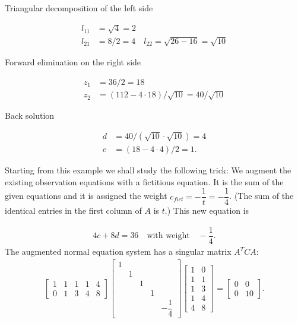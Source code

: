 \begin{adjustwidth}{2em}{2em}
	Triangular decomposition of the left side
\end{adjustwidth}
\begin{align*}
l_{11} &= \sqrt{4} = 2 \\
l_{21} &=  8/2     = 4   \quad    l_{22} = \sqrt{26 - 16}  = \sqrt{10}
\end{align*}
\begin{adjustwidth}{2em}{2em}
	Forward elimination on the right side
\end{adjustwidth}
\begin{align*}
z_{1} &= 36/2 = 18 \\
z_{2} &=  (112 - 4\cdot18) /\sqrt{10}  = 40 /\sqrt{10}
\end{align*}
\begin{adjustwidth}{2em}{2em}
	Back solution 
\end{adjustwidth}
\begin{align*}
d &= 40/(\sqrt{10}\cdot\sqrt{10}) = 4 \\
c &=  (18 - 4\cdot 4) / 2  = 1.
\end{align*}
\begin{flushleft}
	Starting from this example we shall study the following trick: We augment the existing observation equations with a fictitious equation. It is the sum of the given equations and
	it is assigned the weight $ c_{fict} = -\dfrac{1}{t} = - \dfrac{1}{4}$. (The sum of the identical entries in the first 
	column of $A$ is $t$.) This new equation is
\end{flushleft}
\begin{align}
4c+8d = 36 \quad \text{with weight} \quad -\dfrac{1}{4}.
\end{align}
The augmented normal equation system has a singular matrix $A^{T}CA$:
\begin{align*}
\begin{bmatrix}
1 & 1 & 1 & 1 & 4 \\
0 & 1 & 3 & 4 & 8 
\end{bmatrix}
\begin{bmatrix}
1 &  &  &  &  \\
& 1  &  &  &  \\
& &  1  &  &  \\
& &  &  1  &  \\
& &  &  &  -\dfrac{1}{4}  
\end{bmatrix}
\begin{bmatrix}
1 & 0\\
1 & 1\\
1 & 3\\
1 & 4\\
4 & 8
\end{bmatrix} = 
\begin{bmatrix}
0 & 0\\
0 & 10
\end{bmatrix}.
\end{align*}
